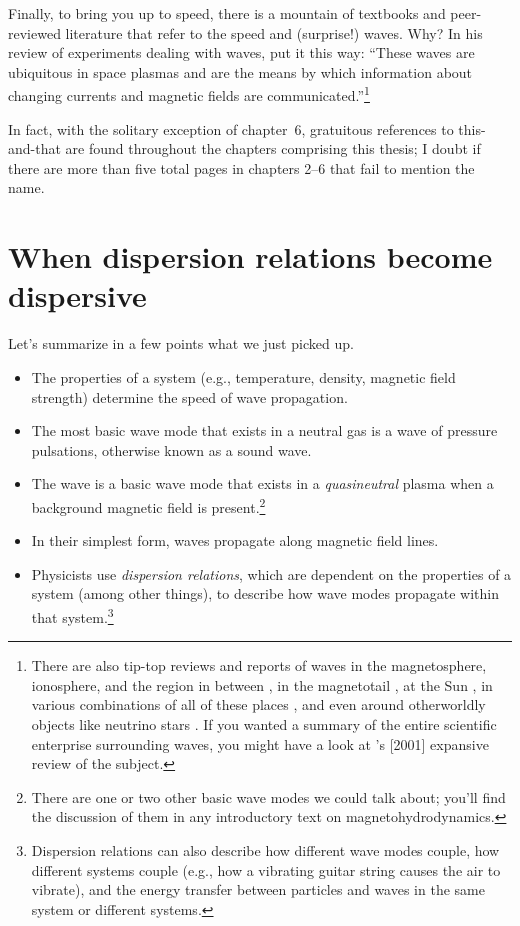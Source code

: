 Finally, to bring you up to speed, there is a mountain of
textbooks and peer-reviewed literature that refer to the \Alf speed and
(surprise!) \Alf waves. Why? In his review of experiments dealing with \Alf
waves, \citet{Gekelman1999} put it this way: ``These waves are ubiquitous in
space plasmas and are the means by which information about changing currents and
magnetic fields are communicated.''\footnote{There are also tip-top reviews and
  reports of \Alf waves in the magnetosphere, ionosphere, and the region in
  between \citep{Stasiewicz2000,Berthomier2011,Mottez2015}, in the magnetotail
  \citep{Keiling2009}, at the Sun \citep{Mathioudakis2013}, in various
  combinations of all of these places \citep{Wu2016a}, and even around
  otherworldly objects like neutrino stars \citep{Thompson1996}. If you wanted a
  summary of the entire scientific enterprise surrounding \Alf waves, you might
  have a look at \citeauthor{Cramer2001}'s [2001] expansive review of the
  subject.}

In fact, with the solitary exception of chapter~6, gratuitous references to \Alf
this-and-that are found throughout the chapters comprising this thesis; I doubt
if there are more than five total pages in chapters 2--6 that fail to mention
the name.

\section[When dispersion relations become dispersive]{When dispersion relations
  become dispersive}

Let's summarize in a few points what we just picked up.
\begin{itemize}
\item The properties of a system (e.g., temperature, density, magnetic field
  strength) determine the speed of wave propagation.
\item The most basic wave mode that exists in a neutral gas is a wave of
  pressure pulsations, otherwise known as a sound wave.
\item The \Alf wave is a basic wave mode that exists in a \textsl{quasineutral}
  plasma when a background magnetic field is present.\footnote{There are one or
    two other basic wave modes we could talk about; you'll find the discussion
    of them in any introductory text on magnetohydrodynamics.}
\item In their simplest form, \Alf waves propagate along magnetic field lines.
\item Physicists use \textsl{dispersion relations}, which are dependent on the
  properties of a system (among other things), to describe how wave modes
  propagate within that system.\footnote{Dispersion relations can also describe
    how different wave modes couple, how different systems couple (e.g., how a
    vibrating guitar string causes the air to vibrate), and the energy transfer
    between particles and waves in the same system or different systems.}
\end{itemize}

